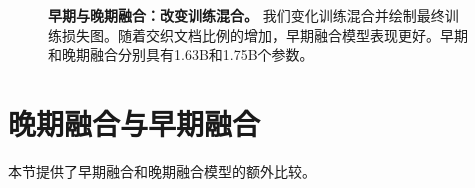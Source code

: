 \begin{table}[htb]
    \centering
    \setlength{\tabcolsep}{16pt}
    \renewcommand{\arraystretch}{1}
    \caption{\textbf{视觉编码器缩放器。} 当从头开始训练后融合模型时，降低视觉编码器的学习率效果更佳。}
    \label{tab:late_scaler_scratch}
\end{table}



\begin{figure}[htp]
    \centering
    \captionsetup{type=figure}
    \begin{subfigure}[t]{0.33\linewidth}
        
    \end{subfigure}
    \begin{subfigure}[t]{0.32\linewidth}
         
    \end{subfigure}
    \begin{subfigure}[t]{0.32\linewidth}
         
    \end{subfigure}

    \vspace{0.3cm}
    \caption{\textbf{早期与晚期融合：改变训练混合。} 我们变化训练混合并绘制最终训练损失图。随着交织文档比例的增加，早期融合模型表现更好。早期和晚期融合分别具有1.63B和1.75B个参数。}
    \label{fig:early_vs_late_datatype_sameflops}
\end{figure}
\section{晚期融合与早期融合}
\label{app:late_vs_early}
本节提供了早期融合和晚期融合模型的额外比较。

